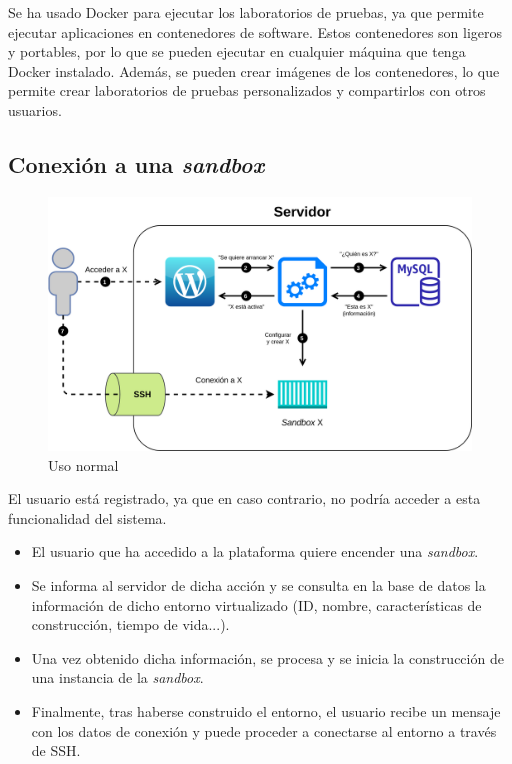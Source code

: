             Se ha usado Docker para ejecutar los laboratorios de pruebas, ya que permite ejecutar aplicaciones en contenedores de software. Estos contenedores son ligeros y portables, por lo que se pueden ejecutar en cualquier máquina que tenga Docker instalado. Además, se pueden crear imágenes de los contenedores, lo que permite crear laboratorios de pruebas personalizados y compartirlos con otros usuarios.
            
        
        \subsection{Conexión a una \textit{sandbox}}
        
        \begin{figure}[h]
            \centering
            \includegraphics[scale=0.20]{images/Diagramas/Arquitectura 1.png}
            \caption{Uso normal}
            \label{fig:conexion-sandbox}
        \end{figure}
        
        El usuario está registrado, ya que en caso contrario, no podría acceder a esta funcionalidad del sistema.
        
        \begin{itemize}
            \item El usuario que ha accedido a la plataforma quiere encender una \textit{sandbox}.
            \item Se informa al servidor de dicha acción y se consulta en la base de datos la información de dicho entorno virtualizado (ID, nombre, características de construcción, tiempo de vida...).
            \item Una vez obtenido dicha información, se procesa y se inicia la construcción de una instancia de la \textit{sandbox}.
            \item Finalmente, tras haberse construido el entorno, el usuario recibe un mensaje con los datos de conexión y puede proceder a conectarse al entorno a través de SSH.
        \end{itemize}
        
